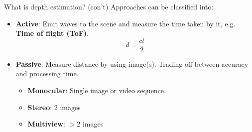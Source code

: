 \documentclass{beamer}
\begin{document}
\begin{frame}{What is depth estimation? (con't)}
Approaches can be classified into:
\begin{itemize}
    \item \textbf{Active}: Emit waves to the scene and measure the time taken by it, e.g. \textbf{Time of flight (ToF)}.
    $$d=\frac{ct}{2}$$
    
    \item \textbf{Passive}: Measure distance by using image(s). Trading off between accuracy and processing time.
    \begin{itemize}
        \item \textbf{Monocular}: Single image or video sequence.
        \item \textbf{Stereo}: 2 images
        \item \textbf{Multiview}: $>2$ images
    \end{itemize}
\end{itemize}
\end{frame}
\end{document}
